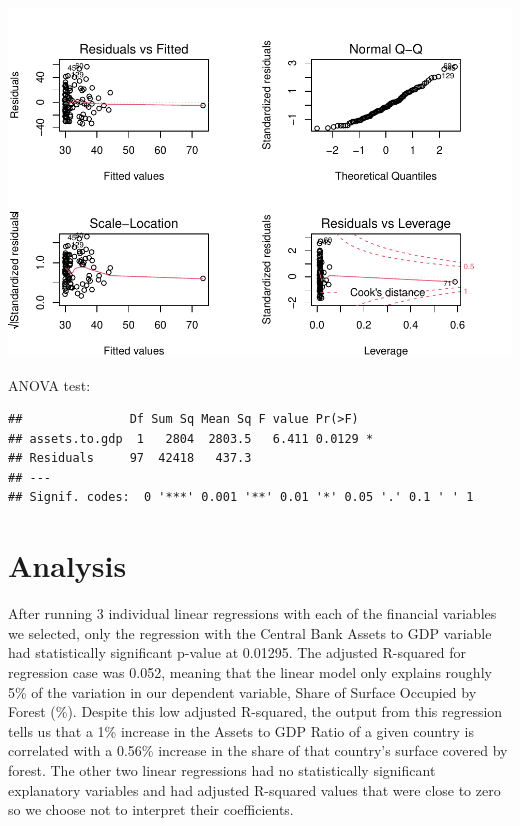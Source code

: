 \documentclass[
  12pt,
]{article}
\let\origfigure\figure
\let\endorigfigure\endfigure
\renewenvironment{figure}[1][2] {
    \expandafter\origfigure\expandafter[H]
} {
    \endorigfigure
}
\begin{document}
\begin{figure}
\centering
\includegraphics{CulbersonDeAngeliShapiro_ENV872_Project_files/figure-latex/unnamed-chunk-6-1.pdf}
\caption{Residuals from Multivariate Regression}
\end{figure}

ANOVA test:

\begin{verbatim}
##               Df Sum Sq Mean Sq F value Pr(>F)  
## assets.to.gdp  1   2804  2803.5   6.411 0.0129 *
## Residuals     97  42418   437.3                 
## ---
## Signif. codes:  0 '***' 0.001 '**' 0.01 '*' 0.05 '.' 0.1 ' ' 1
\end{verbatim}

\newpage

\hypertarget{analysis}{%
\section{Analysis}\label{analysis}}

After running 3 individual linear regressions with each of the financial
variables we selected, only the regression with the Central Bank Assets
to GDP variable had statistically significant p-value at 0.01295. The
adjusted R-squared for regression case was 0.052, meaning that the
linear model only explains roughly 5\% of the variation in our dependent
variable, Share of Surface Occupied by Forest (\%). Despite this low
adjusted R-squared, the output from this regression tells us that a 1\%
increase in the Assets to GDP Ratio of a given country is correlated
with a 0.56\% increase in the share of that country's surface covered by
forest. The other two linear regressions had no statistically
significant explanatory variables and had adjusted R-squared values that
were close to zero so we choose not to interpret their coefficients.
\end{document}
